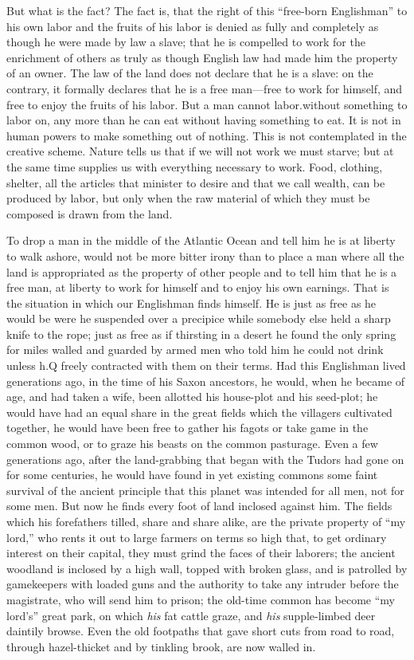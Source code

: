 \documentclass{book}
\begin{document}
But what is the fact? The fact is, that the right of this “free-born Englishman” to his own labor and the fruits of his labor is denied as fully and completely as though he were made by law a slave; that he is compelled to work for the enrichment of others as truly as though English law had made him the property of an owner. The law of the land does not declare that he is a slave: on the contrary, it formally declares that he is a free man—free to work for himself, and free to enjoy the fruits of his labor. But a man cannot labor.without something to labor on, any more than he can eat without having something to eat. It is not in human powers to make something out of nothing. This is not contemplated in the creative scheme. Nature tells us that if we will not work we must starve; but at the same time supplies us with everything necessary to work. Food, clothing, shelter, all the articles that minister to desire and that we call wealth, can be produced by labor, but only when the raw material of which they must be composed is drawn from the land.

To drop a man in the middle of the Atlantic Ocean and tell him he is at liberty to walk ashore, would not be more bitter irony than to place a man where all the land is appropriated as the property of other people and to tell him that he is a free man, at liberty to work for himself and to enjoy his own earnings. That is the situation in which our Englishman finds himself. He is just as free as he would be were he suspended over a precipice while somebody else held a sharp knife to the rope; just as free as if thirsting in a desert he found the only spring for miles walled and guarded by armed men who told him he could not drink unless h.Q freely contracted with them on their terms. Had this Englishman lived generations ago, in the time of his Saxon ancestors, he would, when he became of age, and had taken a wife, been allotted his house-plot and his seed-plot; he would have had an equal share in the great fields which the villagers cultivated together, he would have been free to gather his fagots or take game in the common wood, or to graze his beasts on the common pasturage. Even a few generations ago, after the land-grabbing that began with the Tudors had gone on for some centuries, he would have found in yet existing commons some faint survival of the ancient principle that this planet was intended for all men, not for some men. But now he finds every foot of land inclosed against him. The fields which his forefathers tilled, share and share alike, are the private property of “my lord,” who rents it out to large farmers on terms so high that, to get ordinary interest on their capital, they must grind the faces of their laborers; the ancient woodland is inclosed by a high wall, topped with broken glass, and is patrolled by gamekeepers with loaded guns and the authority to take any intruder before the magistrate, who will send him to prison; the old-time common has become “my lord’s” great park, on which \emph{his} fat cattle graze, and \emph{his} supple-limbed deer daintily browse. Even the old footpaths that gave short cuts from road to road, through hazel-thicket and by tinkling brook, are now walled in.
\end{document}
